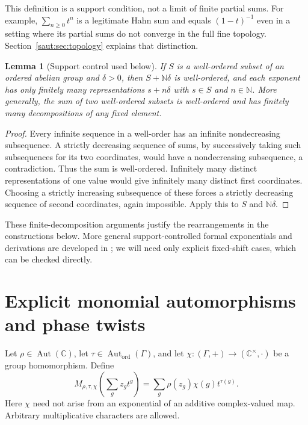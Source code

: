 \documentclass[11pt]{article}
\newtheorem{lemma}[theorem]{Lemma}
\theoremstyle{definition}
\theoremstyle{remark}
\newcommand{\C}{\mathbb C}
\newcommand{\N}{\mathbb N}
\newcommand{\Aut}{\operatorname{Aut}}
\newcommand{\Gh}{\operatorname{Aut}_{\mathrm{ord}}(\Gamma)}
\numberwithin{equation}{section}
\begin{document}
This definition is a support condition, not a limit of finite partial sums.
For example, $\sum_{n\ge0}t^n$ is a legitimate Hahn sum and equals
$(1-t)^{-1}$ even in a setting where its partial sums do not converge in the
full fine topology. Section~\ref{saut:sec:topology} explains that distinction.

\begin{lemma}[Support control used below]\label{saut:lem:support}
If $S$ is a well-ordered subset of an ordered abelian group and $\delta>0$,
then $S+\N\delta$ is well-ordered, and each exponent has only finitely many
representations $s+n\delta$ with $s\in S$ and $n\in\N$.
More generally, the sum of two well-ordered subsets is well-ordered and has
finitely many decompositions of any fixed element.
\end{lemma}
\begin{proof}
Every infinite sequence in a well-order has an infinite nondecreasing
subsequence. A strictly decreasing sequence of sums, by successively taking
such subsequences for its two coordinates, would have a nondecreasing
subsequence, a contradiction. Thus the sum is well-ordered. Infinitely many
distinct representations of one value would give infinitely many distinct
first coordinates. Choosing a strictly increasing subsequence of these
forces a strictly decreasing sequence of second coordinates, again
impossible. Apply this to $S$ and $\N\delta$.
\end{proof}

These finite-decomposition arguments justify the rearrangements in the
constructions below. More general support-controlled formal exponentials
and derivations are developed in \cite{BKKS}; we will need only explicit
fixed-shift cases, which can be checked directly.

\section{Explicit monomial automorphisms and phase twists}\label{saut:sec:explicit}

Let $\rho\in\Aut(\C)$, let $\tau\in\Gh$, and let
$\chi:(\Gamma,+)\to(\C^\times,\cdot)$ be a group homomorphism. Define
\begin{equation}\label{saut:eq:monomial}
 M_{\rho,\tau,\chi}\left(\sum_g z_g t^g\right)
   =\sum_g\rho(z_g)\chi(g)t^{\tau(g)}.
\end{equation}
Here $\chi$ need not arise from an exponential of an additive complex-valued
map. Arbitrary multiplicative characters are allowed.
\end{document}
